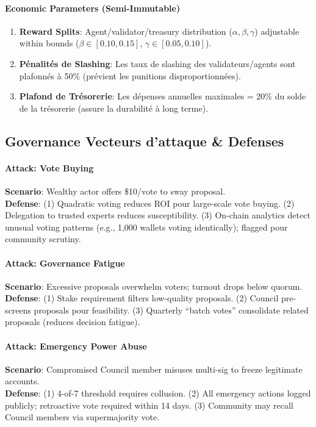 \documentclass[11pt]{article}
\begin{document}
\paragraph{Economic Parameters (Semi-Immutable)}
\begin{enumerate}[noitemsep]
  \item \textbf{Reward Splits}: Agent/validator/treasury distribution ($\alpha, \beta, \gamma$) adjustable within bounds ($\beta \in [0.10, 0.15]$, $\gamma \in [0.05, 0.10]$).
  \item \textbf{Pénalités de Slashing}: Les taux de slashing des validateurs/agents sont plafonnés à 50\% (prévient les punitions disproportionnées).
  \item \textbf{Plafond de Trésorerie}: Les dépenses annuelles maximales = 20\% du solde de la trésorerie (assure la durabilité à long terme).
\end{enumerate}

\subsection{Governance Vecteurs d'attaque \& Defenses}

\paragraph{Attack: Vote Buying}
\textbf{Scenario}: Wealthy actor offers \$10/vote to sway proposal.\\
\textbf{Defense}: (1) Quadratic voting reduces ROI pour large-scale vote buying. (2) Delegation to trusted experts reduces susceptibility. (3) On-chain analytics detect unusual voting patterns (e.g., 1,000 wallets voting identically); flagged pour community scrutiny.

\paragraph{Attack: Governance Fatigue}
\textbf{Scenario}: Excessive proposals overwhelm voters; turnout drops below quorum.\\
\textbf{Defense}: (1) Stake requirement filters low-quality proposals. (2) Council pre-screens proposals pour feasibility. (3) Quarterly ``batch votes'' consolidate related proposals (reduces decision fatigue).

\paragraph{Attack: Emergency Power Abuse}
\textbf{Scenario}: Compromised Council member misuses multi-sig to freeze legitimate accounts.\\
\textbf{Defense}: (1) 4-of-7 threshold requires collusion. (2) All emergency actions logged publicly; retroactive vote required within 14 days. (3) Community may recall Council members via supermajority vote.
\end{document}
